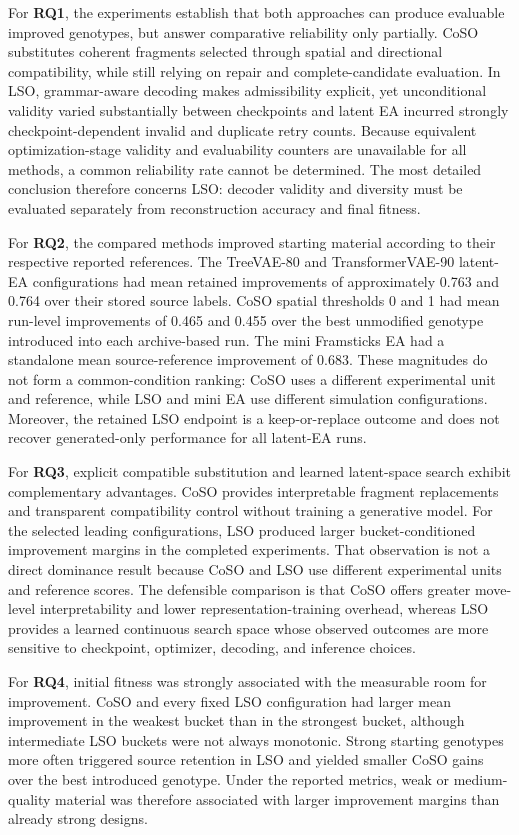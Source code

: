 For \textbf{RQ1}, the experiments establish that both approaches can produce evaluable improved genotypes, but answer comparative reliability only partially. CoSO substitutes coherent fragments selected through spatial and directional compatibility, while still relying on repair and complete-candidate evaluation. In LSO, grammar-aware decoding makes admissibility explicit, yet unconditional validity varied substantially between checkpoints and latent EA incurred strongly checkpoint-dependent invalid and duplicate retry counts. Because equivalent optimization-stage validity and evaluability counters are unavailable for all methods, a common reliability rate cannot be determined. The most detailed conclusion therefore concerns LSO: decoder validity and diversity must be evaluated separately from reconstruction accuracy and final fitness.

For \textbf{RQ2}, the compared methods improved starting material according to their respective reported references. The TreeVAE-80 and TransformerVAE-90 latent-EA configurations had mean retained improvements of approximately 0.763 and 0.764 over their stored source labels. CoSO spatial thresholds 0 and 1 had mean run-level improvements of 0.465 and 0.455 over the best unmodified genotype introduced into each archive-based run. The mini Framsticks EA had a standalone mean source-reference improvement of 0.683. These magnitudes do not form a common-condition ranking: CoSO uses a different experimental unit and reference, while LSO and mini EA use different simulation configurations. Moreover, the retained LSO endpoint is a keep-or-replace outcome and does not recover generated-only performance for all latent-EA runs.

For \textbf{RQ3}, explicit compatible substitution and learned latent-space search exhibit complementary advantages. CoSO provides interpretable fragment replacements and transparent compatibility control without training a generative model. For the selected leading configurations, LSO produced larger bucket-conditioned improvement margins in the completed experiments. That observation is not a direct dominance result because CoSO and LSO use different experimental units and reference scores. The defensible comparison is that CoSO offers greater move-level interpretability and lower representation-training overhead, whereas LSO provides a learned continuous search space whose observed outcomes are more sensitive to checkpoint, optimizer, decoding, and inference choices.

For \textbf{RQ4}, initial fitness was strongly associated with the measurable room for improvement. CoSO and every fixed LSO configuration had larger mean improvement in the weakest bucket than in the strongest bucket, although intermediate LSO buckets were not always monotonic. Strong starting genotypes more often triggered source retention in LSO and yielded smaller CoSO gains over the best introduced genotype. Under the reported metrics, weak or medium-quality material was therefore associated with larger improvement margins than already strong designs.

